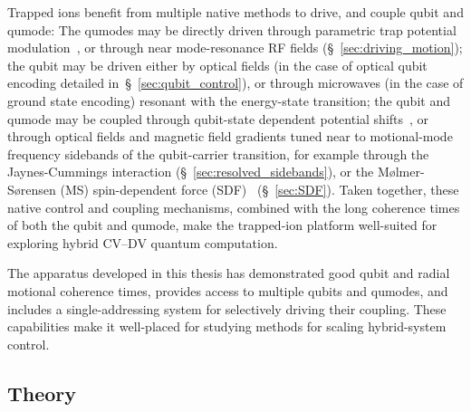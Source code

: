 Trapped ions benefit from multiple native methods to drive, and couple qubit and qumode: 
The qumodes may be directly driven through parametric trap potential
modulation~\cite{heinzen_quantum-limited_1990, burd_quantum_2019,
burd_quantum_2021}, or through near mode-resonance RF fields (\S~\ref{sec:driving_motion}); the qubit may be
driven either by optical fields (in the case of optical qubit encoding detailed in~\S~\ref{sec:qubit_control}), or
through microwaves (in the case of ground state encoding) resonant with the
energy-state transition; 
the qubit and qumode may be coupled through qubit-state dependent potential shifts~\cite{drechsler_state-dependent_2020,leindecker_state-dependent_2026}, or through optical fields and magnetic field gradients tuned near to motional-mode frequency sidebands of the qubit-carrier transition, for example through the Jaynes-Cummings interaction (\S~\ref{sec:resolved_sidebands}), or the Mølmer-Sørensen (MS) spin-dependent force (SDF)~\cite{sorensen_entanglement_2000} (\S~\ref{sec:SDF}).
Taken together, these native control and coupling mechanisms, combined with the long coherence times of both the qubit and qumode, make the trapped-ion platform well-suited for exploring hybrid CV–DV quantum computation.

The apparatus developed in this thesis has demonstrated good qubit and radial
motional coherence times, provides access to multiple qubits and qumodes, and includes 
a single-addressing system for selectively driving their coupling. These capabilities make it 
well-placed for studying methods for scaling hybrid-system control.

\subsection{Theory}

